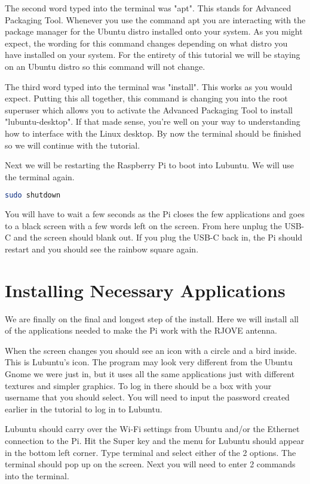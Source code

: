 \documentclass[letterpaper,12pt,notitlepage]{report} %
\begin{document}
The second word typed into the terminal was "apt". This stands for Advanced Packaging Tool. Whenever you use the command apt you are interacting with the package manager for the Ubuntu distro installed onto your system. As you might expect, the wording for this command changes depending on what distro you have installed on your system. For the entirety of this tutorial we will be staying on an Ubuntu distro so this command will not change. 

The third word typed into the terminal was "install". This works as you would expect. Putting this all together, this command is changing you into the root superuser which allows you to activate the Advanced Packaging Tool to install "lubuntu-desktop". If that made sense, you're well on your way to understanding how to interface with the Linux desktop. By now the terminal should be finished so we will continue with the tutorial.

Next we will be restarting the Raspberry Pi to boot into Lubuntu. We will use the terminal again.

\begin{lstlisting}[language=bash]
	sudo shutdown
\end{lstlisting}

You will have to wait a few seconds as the Pi closes the few applications and goes to a black screen with a few words left on the screen. From here unplug the USB-C and the screen should blank out. If you plug the USB-C back in, the Pi should restart and you should see the rainbow square again.

\section{Installing Necessary Applications}

We are finally on the final and longest step of the install. Here we will install all of the applications needed to make the Pi work with the RJOVE antenna. 

When the screen changes you should see an icon with a circle and a bird inside. This is Lubuntu's icon. The program may look very different from the Ubuntu Gnome we were just in, but it uses all the same applications just with different textures and simpler graphics. To log in there should be a box with your username that you should select. You will need to input the password created earlier in the tutorial to log in to Lubuntu. 

Lubuntu should carry over the Wi-Fi settings from Ubuntu and/or the Ethernet connection to the Pi. Hit the Super key and the menu for Lubuntu should appear in the bottom left corner. Type terminal and select either of the 2 options. The terminal should pop up on the screen. Next you will need to enter 2 commands into the terminal.
\end{document}

